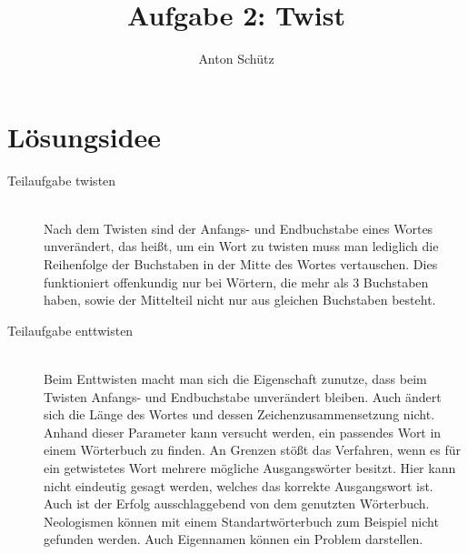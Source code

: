 \documentclass[a4paper,10pt]{scrartcl}
\title{Aufgabe 2: Twist}
\author{Anton Schütz}
\begin{document}
\maketitle
\tableofcontents

\section{Lösungsidee}
\begin{description}
\item[Teilaufgabe twisten]\hfill\\
Nach dem Twisten sind der Anfangs- und Endbuchstabe eines Wortes unverändert, das heißt, um ein Wort zu twisten muss man lediglich die Reihenfolge der Buchstaben in der Mitte des Wortes vertauschen. Dies funktioniert offenkundig nur bei Wörtern, die mehr als 3 Buchstaben haben, sowie der Mittelteil nicht nur aus gleichen Buchstaben besteht.
\item[Teilaufgabe enttwisten]\hfill\\
Beim Enttwisten macht man sich die Eigenschaft zunutze, dass beim Twisten Anfangs- und Endbuchstabe unverändert bleiben. Auch ändert sich die Länge des Wortes und dessen Zeichenzusammensetzung nicht. Anhand dieser Parameter kann versucht werden, ein passendes Wort in einem Wörterbuch zu finden. An Grenzen stößt das Verfahren, wenn es für ein getwistetes Wort mehrere mögliche Ausgangswörter besitzt. Hier kann nicht eindeutig gesagt werden, welches das korrekte Ausgangswort ist. Auch ist der Erfolg ausschlaggebend von dem genutzten Wörterbuch. Neologismen können mit einem Standartwörterbuch zum Beispiel nicht gefunden werden. Auch Eigennamen können ein Problem darstellen.
\end{description}
\end{document}

